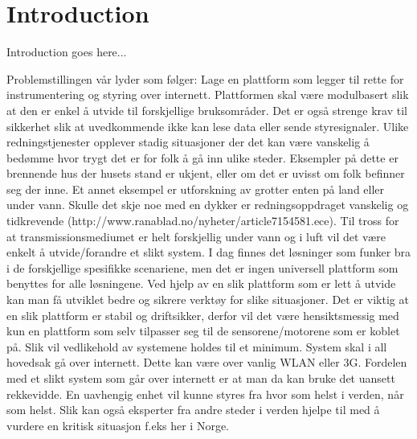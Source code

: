 \chapter{Introduction}
Introduction goes here...

Problemstillingen vår lyder som følger:
Lage en plattform som legger til rette for instrumentering og styring over internett. Plattformen skal være modulbasert slik at den er enkel å utvide til forskjellige  bruksområder. Det er også strenge krav til sikkerhet slik at uvedkommende ikke kan lese data eller sende styresignaler. 
Ulike redningstjenester opplever stadig situasjoner der det kan være vanskelig å bedømme hvor trygt det er for folk å gå inn ulike steder. Eksempler på dette er brennende hus der husets stand er ukjent, eller om det er uvisst om folk befinner seg der inne. Et annet eksempel er utforskning av grotter enten på land eller under vann. Skulle det skje noe med en dykker er redningsoppdraget vanskelig og tidkrevende (http://www.ranablad.no/nyheter/article7154581.ece). Til tross for at transmissionsmediumet er helt forskjellig under vann og i luft vil det være enkelt å utvide/forandre et slikt system.
I dag finnes det løsninger som funker bra i de forskjellige spesifikke scenariene, men det er ingen universell plattform som benyttes for alle løsningene. Ved hjelp av en slik plattform som er lett å utvide kan man få utviklet bedre og sikrere verktøy for slike situasjoner. Det er viktig at en slik plattform er stabil og driftsikker, derfor vil det være hensiktsmessig med kun en plattform som selv tilpasser seg til de sensorene/motorene som er koblet på. Slik vil vedlikehold av systemene holdes til et minimum. 
System skal i all hovedsak gå over internett. Dette kan være over vanlig WLAN eller 3G. Fordelen med et slikt system som går over internett er at man da kan bruke det uansett rekkevidde. En uavhengig enhet vil kunne styres fra hvor som helst i verden, når som helst. Slik kan også eksperter fra andre steder i verden hjelpe til med å vurdere en kritisk situasjon f.eks her i Norge. 

